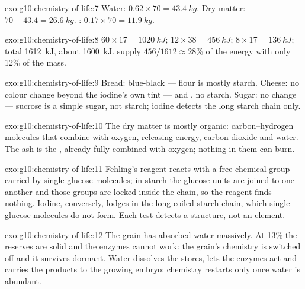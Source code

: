 \begin{solution}{exo:g10:chemistry-of-life:7}
Water: $0.62 \times 70 = \qty{43.4}{kg}$. Dry matter: $70 - 43.4 =
\qty{26.6}{kg}$. : $0.17 \times 70 = \qty{11.9}{kg}$.
\end{solution}

\begin{solution}{exo:g10:chemistry-of-life:8}
 $60 \times 17 = \qty{1020}{kJ}$;  $12 \times 38 =
\qty{456}{kJ}$;  $8 \times 17 = \qty{136}{kJ}$; total
\qty{1612}{kJ}, about \qty{1600}{kJ}.  supply $456/1612 \approx
28\%$ of the energy with only 12\% of the mass.
\end{solution}

\begin{solution}{exo:g10:chemistry-of-life:9}
Bread: blue-black --- flour is mostly starch. Cheese: no colour change
beyond the iodine's own tint ---  and , no starch. Sugar:
no change --- sucrose is a simple sugar, not starch; iodine detects the
long starch chain only.
\end{solution}

\begin{solution}{exo:g10:chemistry-of-life:10}
The dry matter is mostly organic: carbon--hydrogen molecules that
combine with oxygen, releasing energy, carbon dioxide and water. The
ash is the , already fully combined with oxygen; nothing
in them can burn.
\end{solution}

\begin{solution}{exo:g10:chemistry-of-life:11}
Fehling's reagent reacts with a free chemical group carried by single
glucose molecules; in starch the glucose units are joined to one
another and those groups are locked inside the chain, so the reagent
finds nothing. Iodine, conversely, lodges in the long coiled starch
chain, which single glucose molecules do not form. Each test detects a
structure, not an element.
\end{solution}

\begin{solution}{exo:g10:chemistry-of-life:12}
The grain has absorbed water massively. At 13\% the reserves are solid
and the enzymes cannot work: the grain's chemistry is switched off and
it survives dormant. Water dissolves the stores, lets the enzymes act
and carries the products to the growing embryo: chemistry restarts
only once water is abundant.
\end{solution}

